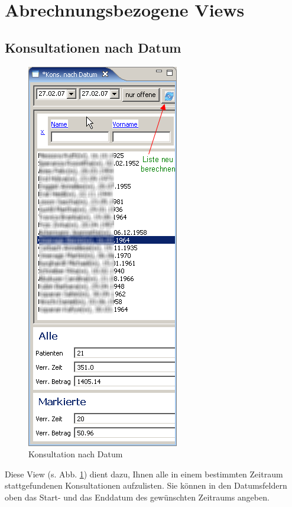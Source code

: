 %

\section{Abrechnungsbezogene Views}
\subsection{Konsultationen nach Datum}
\begin{figure}
\includegraphics{images/konnd}
\caption{Konsultation nach Datum}
\label{fig:konnd}
\end{figure}
Diese View (s. Abb. \ref{fig:konnd}) dient dazu, Ihnen alle in einem bestimmten
Zeitraum stattgefundenen
Konsultationen aufzulisten. Sie können in den Datumsfeldern oben das Start- und
das Enddatum des gewünschten Zeitraums angeben.

